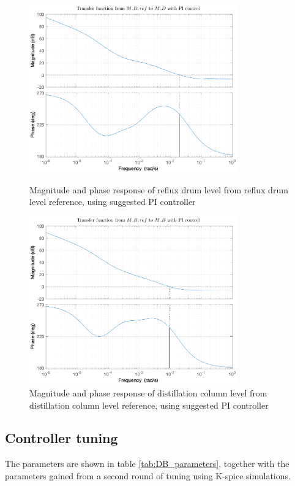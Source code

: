 \documentclass[12pt]{article}
\begin{document}
\begin{figure}
\centering
\includegraphics[width=0.8\textwidth]{../Systemanalyse/Log_Data_to_Matlab/Figurer/Identifisering/MD_PI_bode.eps}
\caption{Magnitude and phase response of reflux drum level from reflux drum level reference, using suggested PI controller}
\label{fig:L11_PI}

\includegraphics[width=0.8\textwidth]{../Systemanalyse/Log_Data_to_Matlab/Figurer/Identifisering/MB_PI_bode.eps}
\caption{Magnitude and phase response of distillation column level from distillation column level reference, using suggested PI controller}
\label{fig:L22_PI}
\end{figure}

\subsection{Controller tuning}
The parameters are shown in table \ref{tab:DB_parameters}, together with the parameters gained from a second round of tuning using K-spice simulations.
\end{document}
